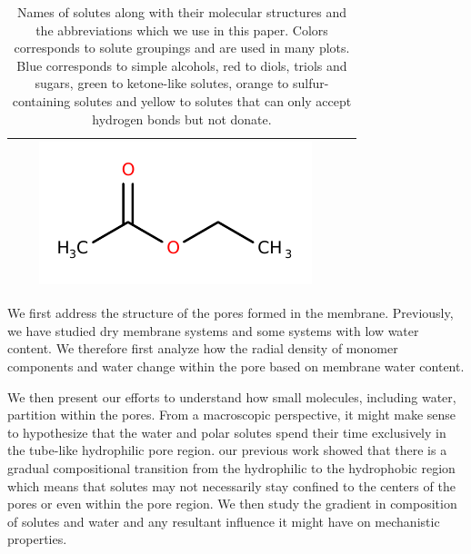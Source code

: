 \documentclass[journal=jpcbfk,manuscript=article]{achemso}
\begin{document}
\begin{table}[h!]
\begin{tabular}{ |m{3.5cm}m{1.4cm}m{2cm}|m{3.8cm}m{1.4cm}m{2cm}| }
    \color{amber}{ethyl acetate} & \color{amber}{EAC} &     
    \begin{minipage}{.1\textwidth}
    \includegraphics[width=\linewidth]{structures/EAC.pdf}
    \end{minipage} \\
  
    \hline
  \end{tabular}
  \caption{Names of solutes along with their molecular structures and the
  abbreviations which we use in this paper. Colors corresponds to solute groupings
  and are used in many plots. Blue corresponds to simple alcohols, red to 
  diols, triols and sugars, green to ketone-like solutes, orange to sulfur-containing
  solutes and yellow to solutes that can only accept hydrogen bonds but not donate.}\label{table:abbreviations}
  \end{table}

 
  We first address the structure of the pores formed in the membrane.
  Previously, we have studied dry membrane systems and some systems with 
  low water content. We 
  therefore first analyze 
  how the radial density of monomer 
  components and water change within the pore based on membrane water content.
  
  We then present our efforts to understand how small molecules, 
  including water, partition within the pores. From a macroscopic perspective,
  it might make sense
  to hypothesize that the water and polar solutes spend
  their time exclusively in the tube-like hydrophilic pore region. 
  our
  previous work showed that there is a gradual compositional transition from
  the hydrophilic to the hydrophobic region which means that solutes may not
  necessarily stay confined to the centers of the pores or even within the 
  pore region. We then study the gradient in composition of solutes and 
  water and any resultant influence it might have on mechanistic properties.
\end{document}
